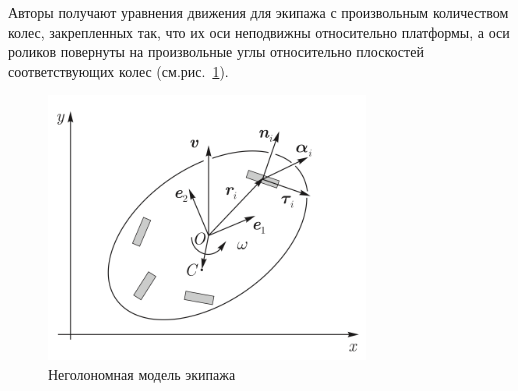 \documentclass[12pt]{article}
\begin{document}
Авторы \cite{borisov} получают уравнения движения для экипажа с произвольным количеством колес, закрепленных так, что их оси неподвижны относительно платформы, а оси роликов повернуты на произвольные углы относительно плоскостей соответствующих колес (см.рис.~\ref{fig:bor_vehicle}).

\begin{figure}[h!]
    \centering
    \includegraphics[width=0.75\textwidth]{img/art/bor_vehicle.png}
    \caption{Неголономная модель экипажа}
    \label{fig:bor_vehicle}
\end{figure}
\end{document}
